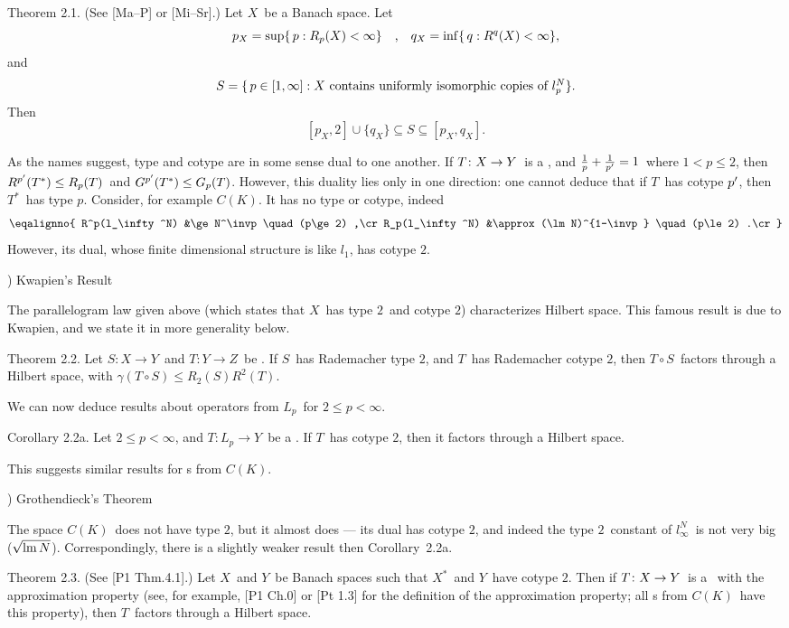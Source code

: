 \proclaim Theorem 2.1. (See [Ma--P] or [Mi--Sr].) Let $X$\ be a Banach
space. Let
$$ p_X=\sup\{\,p:R_p(X)<\infty\} \quad\hbox{,}\quad
   q_X=\inf\{\,q:R^q(X)<\infty\},$$
and
$$ S=\{\,p\in[1,\infty]:\hbox{$X$\ contains uniformly isomorphic
copies of
   $l_p^N$}\}.$$
Then
$$ [p_X,2]\cup\{q_X\} \subseteq S \subseteq [p_X,q_X]. $$
 
As the names suggest, type and cotype are in some sense dual to one
another. If
$T\colon X\to Y$\ is a \blo, and ${1\over p}+{1\over p'}=1$\ where $1<p\le2$, then $R^{p'}(T^*)\le
R_p(T)$\ and $G^{p'}(T^*)\le G_p(T)$. However, this duality lies only
in one
direction: one cannot deduce that if $T$\ has cotype ${p'}$, then
$T^*$\ has
type $p$. Consider, for example $C(K)$. It has no type or cotype,
indeed
$$ \eqalignno{
   R^p(l_\infty^N) &\ge N^\invp \quad (p\ge2) ,\cr
   R_p(l_\infty^N) &\approx (\lm N)^{1-\invp} \quad (p\le2) .\cr
}$$
However, its dual, whose finite dimensional structure is like $l_1$,
has cotype
$2$.
 
) Kwapien's Result
 
The parallelogram law given above (which states that $X$\ has type
$2$\ and
cotype $2$) characterizes Hilbert space. This famous result is due
to Kwapien,
and we state it in more generality below.
 
\proclaim Theorem 2.2. Let $S\colon X\to Y$\ and $T\colon Y\to Z$\
be \blobBs.
If $S$\ has Rademacher type $2$, and $T$\ has Rademacher cotype $2$,
then
$T\circ S$\ factors through a Hilbert space, with $\gamma(T\circ
S)\le R_2(S)
R^2(T)$.
 
We can now deduce results about operators from $L_p$\ for $2\le p<\infty$.
 
\proclaim Corollary 2.2a. Let $2\le p<\infty$, and $T\colon L_p\to
Y$\ be a
\blotaBs. If $T$\ has cotype $2$, then it factors through a Hilbert
space.
 
This suggests similar results for \blo s from $C(K)$.
 
) Grothendieck's Theorem
 
The space $C(K)$\ does not have type $2$, but it almost does ---
its dual has
cotype $2$, and indeed the type $2$\ constant of $l_\infty^N$\ is
not very big
($\sqrt{\mathop{\rm lm}\nolimits N}$). Correspondingly, there is a slightly weaker result
then
Corollary~2.2a.
 
\proclaim Theorem 2.3. (See [P1 Thm.4.1].) Let $X$\ and $Y$\ be Banach
spaces such that $X^*$\ and
$Y$\ have cotype $2$. Then if $T\colon X\to Y$\ is a \blo\ with the approximation
property (see, for example, [P1 Ch.0] or [Pt 1.3] for the definition
of the approximation
property; all \blo s from $C(K)$\ have this property), then $T$\
factors
through a Hilbert space.
 
